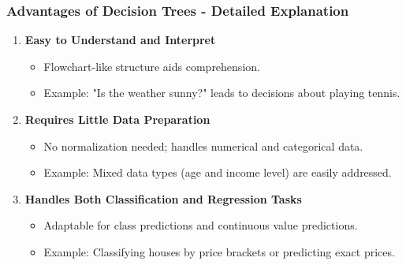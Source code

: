 \documentclass[aspectratio=169]{beamer}
\begin{document}
\begin{frame}[fragile]
    \frametitle{Advantages of Decision Trees - Detailed Explanation}
    \begin{enumerate}
        \item \textbf{Easy to Understand and Interpret}
            \begin{itemize}
                \item Flowchart-like structure aids comprehension.
                \item Example: "Is the weather sunny?" leads to decisions about playing tennis.
            \end{itemize}
        \item \textbf{Requires Little Data Preparation}
            \begin{itemize}
                \item No normalization needed; handles numerical and categorical data.
                \item Example: Mixed data types (age and income level) are easily addressed.
            \end{itemize}
        \item \textbf{Handles Both Classification and Regression Tasks}
            \begin{itemize}
                \item Adaptable for class predictions and continuous value predictions.
                \item Example: Classifying houses by price brackets or predicting exact prices.
            \end{itemize}
    \end{enumerate}
\end{frame}
\end{document}
